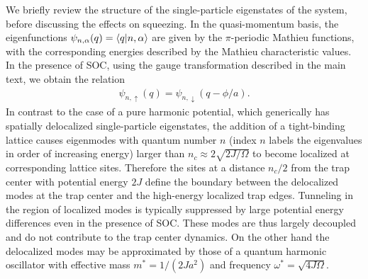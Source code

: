 \documentclass{nature}
\begin{document}
We briefly review the structure of the single-particle eigenstates of the system, before discussing the effects on squeezing. In the quasi-momentum basis, the eigenfunctions $\psi_{n,\alpha}(q) = \braket{q|n,\alpha}$ are given by the $\pi$-periodic Mathieu functions, with the corresponding energies described by the Mathieu characteristic values\cite{rey2005ultracold}. In the presence of SOC, using  the gauge transformation described in the main text, we obtain the relation
\begin{gather}
    \psi_{n,\uparrow}(q) = \psi_{n,\downarrow}(q-\phi/a).
    \label{eq:trap_states}
\end{gather}
In contrast to the case of a pure harmonic potential, which generically has spatially delocalized single-particle eigenstates, the addition of a tight-binding lattice causes eigenmodes with quantum number $n$ (index $n$ labels the eigenvalues in order of increasing energy) larger than $n_c \approx 2\sqrt{2J/\Omega}$ to become localized at corresponding lattice sites. Therefore the  sites at a distance $n_c/2$ from the trap center with  potential energy $2J$ define  the boundary between the delocalized modes at the trap center and the high-energy localized trap edges. Tunneling in the region of  localized modes is typically suppressed by large potential energy differences even in the presence of SOC. These modes are thus largely decoupled and do not contribute to the trap center dynamics. On the other hand the delocalized modes may be approximated by those of a quantum harmonic oscillator with effective mass $m^{*}=1/(2Ja^2)$ and frequency $\omega^* = \sqrt{4J\Omega}$.
\end{document}
